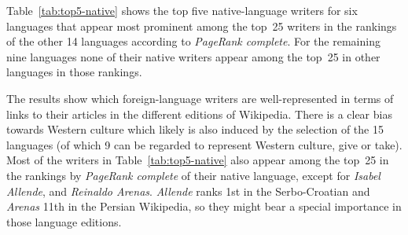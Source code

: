 \documentclass[a4paper,12pt]{scrartcl}
\begin{document}
%
%
Table~\ref{tab:top5-native} shows the top five native-language
writers for six languages that appear most prominent
among the top~25 writers in the rankings of the
other 14 languages according to \emph{PageRank
  complete}. 
%
For the remaining nine languages none of their native writers appear
among the top~25 in other languages in those rankings.


The results show which foreign-language writers are well-represented
in terms of links to their articles in the different editions of Wikipedia.
%
There is a clear bias towards Western
culture which likely is also induced by the selection of the 15
languages (of which 9 can be regarded to represent Western culture,
give or take).
%
Most of the writers in Table~\ref{tab:top5-native} also appear
among the top~25 in the rankings by \emph{PageRank complete} of
their native language, except for \emph{Isabel Allende},
and \emph{Reinaldo Arenas}.
%
\emph{Allende} ranks 1st in the Serbo-Croatian and
\emph{Arenas} 11th in the Persian Wikipedia, so they
might bear a special importance in those language editions.
\end{document}
